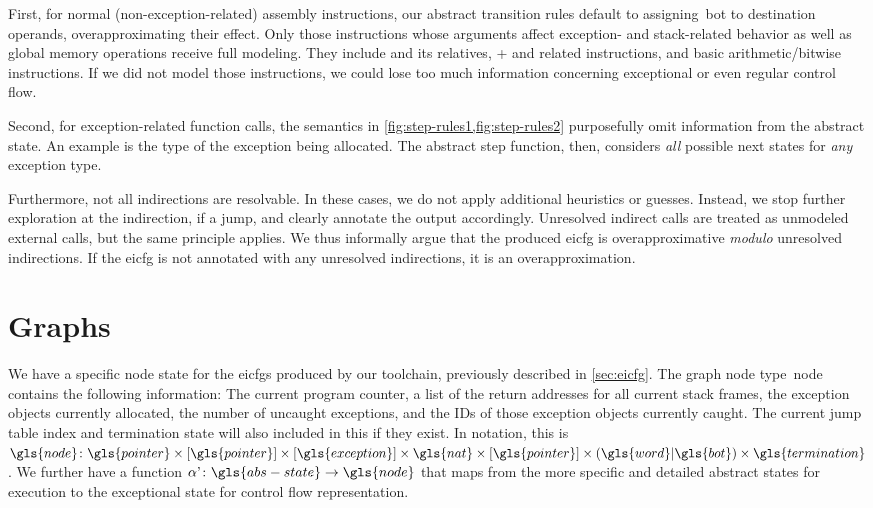 First, for normal (non-exception-related) assembly instructions, our abstract transition rules default to assigning~\gls{bot} to destination operands, overapproximating their effect.
Only those instructions whose arguments affect exception- and stack-related behavior as well as global memory operations receive full modeling.
They include  and its relatives, + and related instructions, and basic arithmetic/bitwise instructions.
If we did not model those instructions, we could lose too much information concerning exceptional or even regular control flow.

Second, for exception-related function calls, the semantics in \cref{fig:step-rules1,fig:step-rules2} purposefully omit information from the abstract state.
An example is the type of the exception being allocated.
The abstract step function, then, considers \emph{all} possible next states for \emph{any} exception type.

Furthermore, not all indirections are resolvable.
In these cases, we do not apply additional heuristics or guesses.
Instead, we stop further exploration at the indirection, if a jump, and clearly annotate the output accordingly.
Unresolved indirect calls are treated as unmodeled external calls, but the same principle applies.
We thus informally argue that the produced \ac{eicfg} is overapproximative \emph{modulo} unresolved indirections.
If the \ac{eicfg} is not annotated with any unresolved indirections, it is an overapproximation. %

\section{Graphs}
We have a specific node state for the \acp{eicfg} produced by our toolchain,
previously described in \cref{sec:eicfg}.
The graph node type~\gls{node} contains the following information:
The current program counter,
a list of the return addresses for all current stack frames,
the exception objects currently allocated,
the number of uncaught exceptions,
and the IDs of those exception objects currently caught.
The current jump table index and termination state will also included in this if they exist. In notation, this is
$\gls{node}\colon\gls{pointer}\times[\gls{pointer}]\times[\gls{exception}]\times\gls{nat}\times[\gls{pointer}]\times(\gls{word}|\gls{bot})\times\gls{termination}$.
We further have a function $\stateToNode\colon\gls{abs-state}\rightarrow\gls{node}$
that maps from the more specific and detailed abstract states for execution
to the exceptional state for control flow representation.

